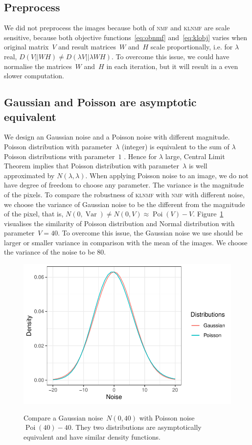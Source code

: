 \subsection{Preprocess}
We did not preprocess the images because both of \textsc{nmf} and \textsc{klnmf} are scale sensitive, because both objective functions~\eqref{eq:obnmf} and~\eqref{eq:klobj} varies when original matrix~$V$ and result matrices~$W$ and~$H$ scale proportionally, i.e. for $\lambda$ real, $D(V||WH)\neq D(\lambda V||\lambda WH)$. To overcome this issue, we could have normalise the matrices~$W$ and~$H$ in each iteration, but it will result in a even slower computation.

\subsection{Gaussian and Poisson are asymptotic equivalent}
 We design an Gaussian noise and a Poisson noise with different magnitude.
 Poisson distribution with parameter~$\lambda$ (integer) is equivalent to the sum of $\lambda$ Poisson distributions with parameter~$1$ \citep[][p. 45]{Walck:1996cca}.
 Hence for $\lambda$ large, Central Limit Theorem implies that Poisson distribution with parameter~$\lambda$ is well approximated by $N(\lambda,\lambda)$.
 When applying Poisson noise to an image, we do not have degree of freedom to choose any parameter.
 The variance is the magnitude of the pixels. To compare the robustness of \textsc{klnmf} with \textsc{nmf} with different noise, we choose the variance of Gaussian noise to be the different from the magnitude of the pixel, that is, $N(0,\operatorname{Var})\neq N(0,V)\approx \operatorname{Poi}(V)-V$.
 Figure~\ref{noise} visualises the similarity of Poisson distribution and Normal distribution with parameter~$V=40$. To overcome this issue, the Gaussian noise we use should be larger or smaller variance in comparison with the mean of the images. We choose the variance of the noise to be $80$.
\begin{figure}
  \centering
  \includegraphics[scale=1]{resource/noise}\\
  \caption{Compare a Gaussian noise~$N(0,40)$ with Poisson noise $\operatorname{Poi}(40)-40$. They two distributions are asymptotically equivalent and have similar density functions.}\label{noise}
\end{figure}

